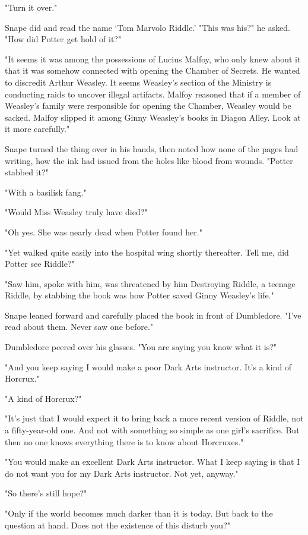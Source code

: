 "Turn it over."

Snape did and read the name `Tom Marvolo Riddle.' "This was his?" he asked. "How did Potter get hold of it?"

"It seems it was among the possessions of Lucius Malfoy, who only knew about it that it was somehow connected with opening the Chamber of Secrets. He wanted to discredit Arthur Weasley. It seems Weasley's section of the Ministry is conducting raids to uncover illegal artifacts. Malfoy reasoned that if a member of Weasley's family were responsible for opening the Chamber, Weasley would be sacked. Malfoy slipped it among Ginny Weasley's books in Diagon Alley. Look at it more carefully."

Snape turned the thing over in his hands, then noted how none of the pages had writing, how the ink had issued from the holes like blood from wounds. "Potter stabbed it?"

"With a basilisk fang."

"Would Miss Weasley truly have died?"

"Oh yes. She was nearly dead when Potter found her."

"Yet walked quite easily into the hospital wing shortly thereafter. Tell me, did Potter see Riddle?"

"Saw him, spoke with him, was threatened by him{\el} Destroying Riddle, a teenage Riddle, by stabbing the book was how Potter saved Ginny Weasley's life."

Snape leaned forward and carefully placed the book in front of Dumbledore. "I've read about them. Never saw one before."

Dumbledore peered over his glasses. "You are saying you know what it is?"

"And you keep saying I would make a poor Dark Arts instructor. It's a kind of Horcrux."

"A kind of Horcrux?"

"It's just that I would expect it to bring back a more recent version of Riddle, not a fifty-year-old one. And not with something so simple as one girl's sacrifice. But then no one knows everything there is to know about Horcruxes."

"You would make an excellent Dark Arts instructor. What I keep saying is that I do not want you for my Dark Arts instructor. Not yet, anyway."

"So there's still hope?"

"Only if the world becomes much darker than it is today. But back to the question at hand. Does not the existence of this disturb you?"

